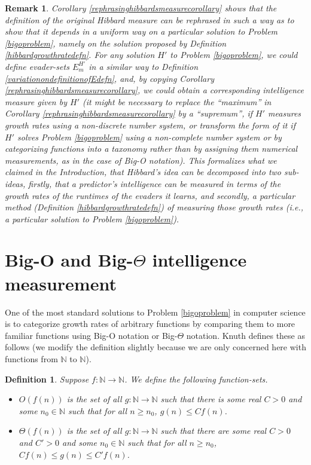 \documentclass{article}
\newtheorem{definition}[theorem]{Definition}
\newtheorem{remark}[theorem]{Remark}
\begin{document}
\begin{remark}
\label{epiphanyremark}
Corollary \ref{rephrasinghibbardsmeasurecorollary} shows that
the definition of the original Hibbard measure can be rephrased in such a way
as to show that it depends in a uniform way on a particular solution to
Problem \ref{bigoproblem}, namely on the solution proposed by
Definition \ref{hibbardgrowthratedefn}. For \emph{any} solution $H'$ to
Problem \ref{bigoproblem}, we could define evader-sets $E^{H'}_m$ in a similar
way to Definition \ref{variationondefinitionofEdefn}, and, by copying
Corollary \ref{rephrasinghibbardsmeasurecorollary}, we could obtain a corresponding
intelligence measure given by $H'$ (it might be necessary to replace the
``maximum'' in Corollary \ref{rephrasinghibbardsmeasurecorollary}
by a ``supremum'', if $H'$ measures growth rates using
a non-discrete number system, or transform the form of it if $H'$
solves Problem \ref{bigoproblem} using a non-complete number system or
by categorizing functions into a taxonomy
rather than by assigning
them numerical measurements, as in the case of Big-O notation). This
formalizes what we claimed in the Introduction,
that Hibbard's idea can be decomposed into two sub-ideas, firstly, that a predictor's
intelligence can be measured in terms of the growth rates of the runtimes of the
evaders it learns, and secondly, a particular method
(Definition \ref{hibbardgrowthratedefn})
of measuring those growth rates (i.e., a particular solution to
Problem \ref{bigoproblem}).
\end{remark}


\section{Big-O and Big-$\Theta$ intelligence measurement}
\label{bigosection}

One of the most standard solutions
to Problem \ref{bigoproblem} in computer science is to categorize
growth rates of arbitrary functions by comparing them to more familiar functions using
Big-O notation or Big-$\Theta$ notation.
Knuth defines \cite{knuth1976big} these as follows
(we modify the definition slightly because
we are only concerned here with functions from $\mathbb N$ to $\mathbb N$).

\begin{definition}
\label{bigodefn}
    Suppose $f:\mathbb N\to\mathbb N$. We define the following function-sets.
    \begin{itemize}
        \item
        $O(f(n))$ is the set of all $g:\mathbb N\to\mathbb N$ such that
        there is some real $C>0$ and some $n_0\in\mathbb N$ such that
        for all $n\geq n_0$, $g(n)\leq Cf(n)$.
        \item
        $\Theta(f(n))$ is the set of all $g:\mathbb N\to\mathbb N$ such that
        there are some real $C>0$ and $C'>0$ and some $n_0\in\mathbb N$ such that
        for all $n\geq n_0$, $Cf(n)\leq g(n)\leq C'f(n)$.
    \end{itemize}
\end{definition}
\end{document}
